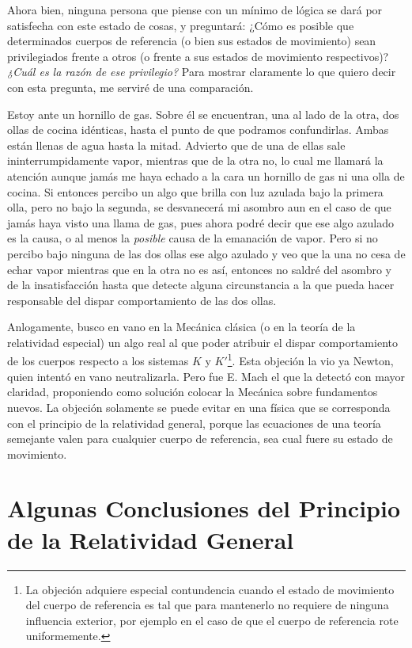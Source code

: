\documentclass[spanish]{book}
\begin{document}
Ahora bien, ninguna persona que piense con un mínimo de lógica se dará por
satisfecha con este estado de cosas, y preguntará: ¿Cómo es posible que determinados
cuerpos de referencia (o bien sus estados de movimiento) sean privilegiados frente a
otros (o frente a sus estados de movimiento respectivos)? \textit{¿Cuál es la razón de ese
privilegio?} Para mostrar claramente lo que quiero decir con esta pregunta, me serviré de
una comparación.

Estoy ante un hornillo de gas. Sobre él se encuentran, una al lado de la otra, dos ollas
de cocina idénticas, hasta el punto de que podramos confundirlas. Ambas están
llenas de agua hasta la mitad. Advierto que de una de ellas sale ininterrumpidamente
vapor, mientras que de la otra no, lo cual me llamará la atención aunque jamás me haya
echado a la cara un hornillo de gas ni una olla de cocina. Si entonces percibo un algo que
brilla con luz azulada bajo la primera olla, pero no bajo la segunda, se desvanecerá mi
asombro aun en el caso de que jamás haya visto una llama de gas, pues ahora podré
decir que ese algo azulado es la causa, o al menos la \textit{posible} causa de la emanación de
vapor. Pero si no percibo bajo ninguna de las dos ollas ese algo azulado y veo que la
una no cesa de echar vapor mientras que en la otra no es así, entonces no saldré del
asombro y de la insatisfacción hasta que detecte alguna circunstancia a la que pueda
hacer responsable del dispar comportamiento de las dos ollas.

Anlogamente, busco en vano en la Mecánica clásica (o en la teoría de la relatividad
especial) un algo real al que poder atribuir el dispar comportamiento de los cuerpos
respecto a los sistemas $K$ y $K'$\footnote{La objeción adquiere especial contundencia
cuando el estado de movimiento del cuerpo de referencia es tal que para mantenerlo 
no requiere de ninguna influencia exterior, por ejemplo en el caso de que el cuerpo
de referencia rote uniformemente.}. Esta objeción la vio ya Newton, quien intentó en vano
neutralizarla. Pero fue E. Mach el que la detectó con mayor claridad, proponiendo como
solución colocar la Mecánica sobre fundamentos nuevos. La objeción solamente se
puede evitar en una física que se corresponda con el principio de la relatividad general,
porque las ecuaciones de una teoría semejante valen para cualquier cuerpo de referencia,
sea cual fuere su estado de movimiento.


\chapter{Algunas Conclusiones del Principio de la Relatividad General}
\end{document}

